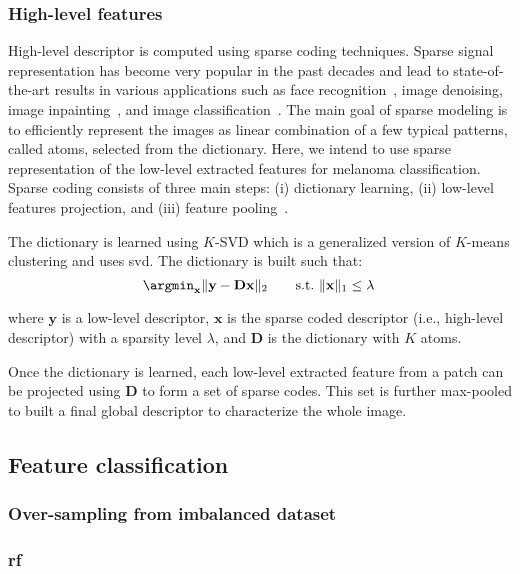 \subsubsection{High-level features}
High-level descriptor is computed using sparse coding techniques. Sparse signal representation has become very popular in the past decades and lead to state-of-the-art results in various applications such as face recognition~\cite{wright2009robust}, image denoising, image inpainting~\cite{elad2006image}, and image classification~\cite{sidibe2015discrimination}. The main goal of sparse modeling is to efficiently represent the images as linear combination of a few typical patterns, called atoms, selected from the dictionary. Here, we intend to use sparse representation of the low-level extracted features for melanoma classification. Sparse coding consists of three main steps: (i) dictionary learning, (ii) low-level features projection, and (iii) feature pooling~\cite{rubinstein2008efficient}. 

The dictionary is learned using $K$-SVD which is a generalized version of $K$-means clustering and uses \ac{svd}. The dictionary is built such that:
\begin{equation}
  \argmin_{\mathbf{x}} \|\mathbf{y} - \mathbf{D}\mathbf{x}\|_{2} \qquad  \text{s.t.} \  \|\mathbf{x}\|_{1} \leq \lambda \,
\end{equation}

\noindent where $\mathbf{y}$ is a low-level descriptor, $\mathbf{x}$ is the sparse coded descriptor (i.e., high-level descriptor) with a sparsity level $\lambda$, and $\mathbf{D}$ is the dictionary with $K$ atoms.

Once the dictionary is learned, each low-level extracted feature from a patch can be projected using $\mathbf{D}$ to form a set of sparse codes. This set is further max-pooled to built a final global descriptor to characterize the whole image.
\subsection{Feature classification}

\subsubsection{Over-sampling from imbalanced dataset}

\subsubsection{\acf*{rf}}

